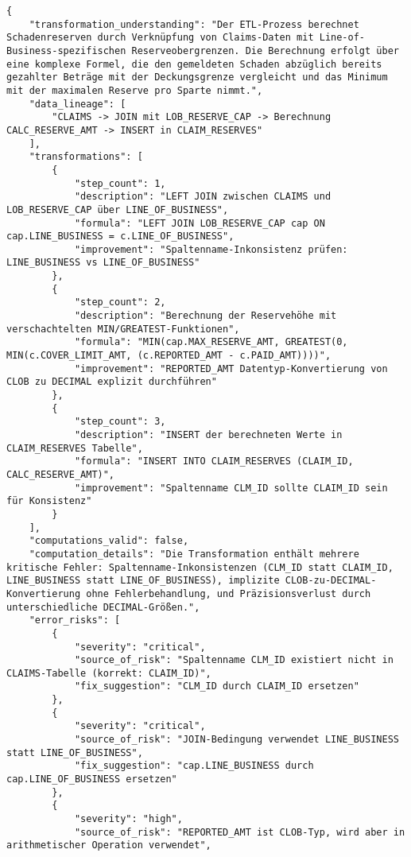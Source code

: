 \begin{lstlisting}[caption={Ausgabe: Claude Sonnet 4 Anwendungsfall 10 Konsistenzdurchlauf},label={claude_case10_prompt2}]
{
    "transformation_understanding": "Der ETL-Prozess berechnet Schadenreserven durch Verknüpfung von Claims-Daten mit Line-of-Business-spezifischen Reserveobergrenzen. Die Berechnung erfolgt über eine komplexe Formel, die den gemeldeten Schaden abzüglich bereits gezahlter Beträge mit der Deckungsgrenze vergleicht und das Minimum mit der maximalen Reserve pro Sparte nimmt.",
    "data_lineage": [
        "CLAIMS -> JOIN mit LOB_RESERVE_CAP -> Berechnung CALC_RESERVE_AMT -> INSERT in CLAIM_RESERVES"
    ],
    "transformations": [
        {
            "step_count": 1,
            "description": "LEFT JOIN zwischen CLAIMS und LOB_RESERVE_CAP über LINE_OF_BUSINESS",
            "formula": "LEFT JOIN LOB_RESERVE_CAP cap ON cap.LINE_BUSINESS = c.LINE_OF_BUSINESS",
            "improvement": "Spaltenname-Inkonsistenz prüfen: LINE_BUSINESS vs LINE_OF_BUSINESS"
        },
        {
            "step_count": 2,
            "description": "Berechnung der Reservehöhe mit verschachtelten MIN/GREATEST-Funktionen",
            "formula": "MIN(cap.MAX_RESERVE_AMT, GREATEST(0, MIN(c.COVER_LIMIT_AMT, (c.REPORTED_AMT - c.PAID_AMT))))",
            "improvement": "REPORTED_AMT Datentyp-Konvertierung von CLOB zu DECIMAL explizit durchführen"
        },
        {
            "step_count": 3,
            "description": "INSERT der berechneten Werte in CLAIM_RESERVES Tabelle",
            "formula": "INSERT INTO CLAIM_RESERVES (CLAIM_ID, CALC_RESERVE_AMT)",
            "improvement": "Spaltenname CLM_ID sollte CLAIM_ID sein für Konsistenz"
        }
    ],
    "computations_valid": false,
    "computation_details": "Die Transformation enthält mehrere kritische Fehler: Spaltenname-Inkonsistenzen (CLM_ID statt CLAIM_ID, LINE_BUSINESS statt LINE_OF_BUSINESS), implizite CLOB-zu-DECIMAL-Konvertierung ohne Fehlerbehandlung, und Präzisionsverlust durch unterschiedliche DECIMAL-Größen.",
    "error_risks": [
        {
            "severity": "critical",
            "source_of_risk": "Spaltenname CLM_ID existiert nicht in CLAIMS-Tabelle (korrekt: CLAIM_ID)",
            "fix_suggestion": "CLM_ID durch CLAIM_ID ersetzen"
        },
        {
            "severity": "critical",
            "source_of_risk": "JOIN-Bedingung verwendet LINE_BUSINESS statt LINE_OF_BUSINESS",
            "fix_suggestion": "cap.LINE_BUSINESS durch cap.LINE_OF_BUSINESS ersetzen"
        },
        {
            "severity": "high",
            "source_of_risk": "REPORTED_AMT ist CLOB-Typ, wird aber in arithmetischer Operation verwendet",

\end{lstlisting}
